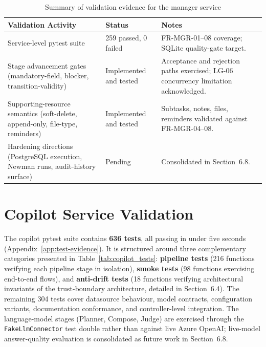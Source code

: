 \begin{table}[H]
\centering
\renewcommand{\arraystretch}{1.4}
\begin{tabularx}{\textwidth}{|p{4cm}|p{3cm}|>{\RaggedRight\arraybackslash}X|}
\hline
\rowcolor{lightgray}
\textbf{Validation Activity} & \textbf{Status} & \textbf{Notes} \\ \hline
Service-level pytest suite & 259 passed, 0 failed & FR-MGR-01--08 coverage; SQLite quality-gate target. \\ \hline
Stage advancement gates (mandatory-field, blocker, transition-validity) & Implemented and tested & Acceptance and rejection paths exercised; LG-06 concurrency limitation acknowledged. \\ \hline
Supporting-resource semantics (soft-delete, append-only, file-type, reminders) & Implemented and tested & Subtasks, notes, files, reminders validated against FR-MGR-04--08. \\ \hline
Hardening directions (PostgreSQL execution, Newman runs, audit-history surface) & Pending & Consolidated in Section~6.8. \\ \hline
\end{tabularx}
\caption{Summary of validation evidence for the manager service}
\label{tab:manager_validation}
\end{table}

\section{Copilot Service Validation}
The copilot pytest suite contains \textbf{636 tests}, all passing in under five seconds (Appendix~\ref{app:test-evidence}). It is structured around three complementary categories presented in Table~\ref{tab:copilot_tests}: \textbf{pipeline tests} (216 functions verifying each pipeline stage in isolation), \textbf{smoke tests} (98 functions exercising end-to-end flows), and \textbf{anti-drift tests} (18 functions verifying architectural invariants of the trust-boundary architecture, detailed in Section~6.4). The remaining 304 tests cover datasource behaviour, model contracts, configuration variants, documentation conformance, and controller-level integration. The language-model stages (Planner, Compose, Judge) are exercised through the \texttt{FakeLlmConnector} test double rather than against live Azure OpenAI; live-model answer-quality evaluation is consolidated as future work in Section~6.8.

